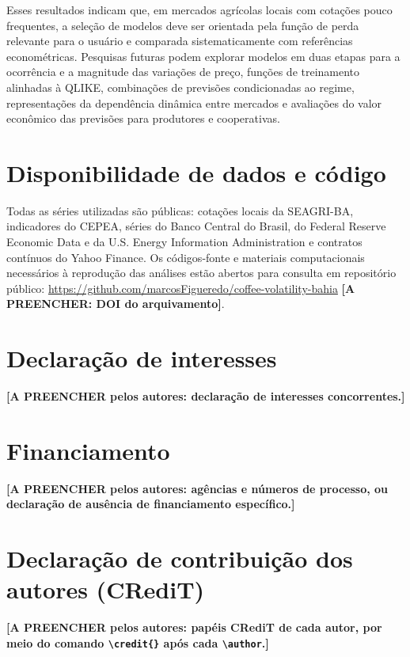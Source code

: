 \documentclass[a4paper,fleqn]{cas-sc}
\begin{document}
Esses resultados indicam que, em mercados agrícolas locais com cotações pouco frequentes, a seleção de modelos deve ser orientada pela função de perda relevante para o usuário e comparada sistematicamente com referências econométricas. Pesquisas futuras podem explorar modelos em duas etapas para a ocorrência e a magnitude das variações de preço, funções de treinamento alinhadas à QLIKE, combinações de previsões condicionadas ao regime, representações da dependência dinâmica entre mercados e avaliações do valor econômico das previsões para produtores e cooperativas.




\section*{Disponibilidade de dados e código}
Todas as séries utilizadas são públicas: cotações locais da SEAGRI-BA, indicadores do CEPEA, séries do Banco Central do Brasil, do Federal Reserve Economic Data e da U.S. Energy Information Administration e contratos contínuos do Yahoo Finance. Os códigos-fonte e materiais computacionais necessários à reprodução das análises estão abertos para consulta em repositório público: \url{https://github.com/marcosFigueredo/coffee-volatility-bahia} \textbf{[A PREENCHER: DOI do arquivamento]}.

\section*{Declaração de interesses}
\textbf{[A PREENCHER pelos autores: declaração de interesses concorrentes.]}

\section*{Financiamento}
\textbf{[A PREENCHER pelos autores: agências e números de processo, ou declaração de ausência de financiamento específico.]}

\section*{Declaração de contribuição dos autores (CRediT)}
\textbf{[A PREENCHER pelos autores: papéis CRediT de cada autor, por meio do comando \texttt{\textbackslash credit\{\}} após cada \texttt{\textbackslash author}.]}
\end{document}
